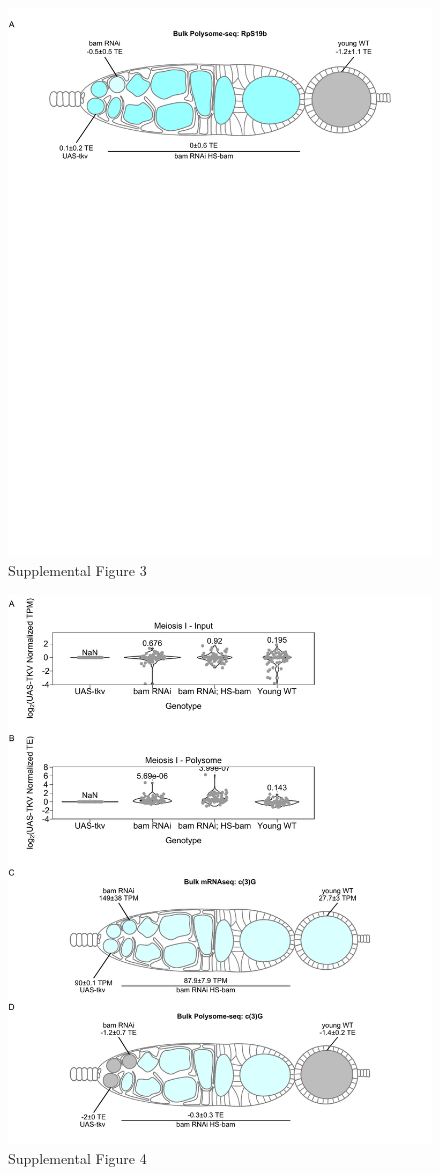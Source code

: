 \documentclass[
]{article}
\begin{document}
\begin{figure}
\centering
\includegraphics{Supplemental_Figure3.pdf}
\caption{Supplemental Figure 3}
\end{figure}

\begin{figure}
\centering
\includegraphics{Supplemental_Figure4.pdf}
\caption{Supplemental Figure 4}
\end{figure}
\end{document}
